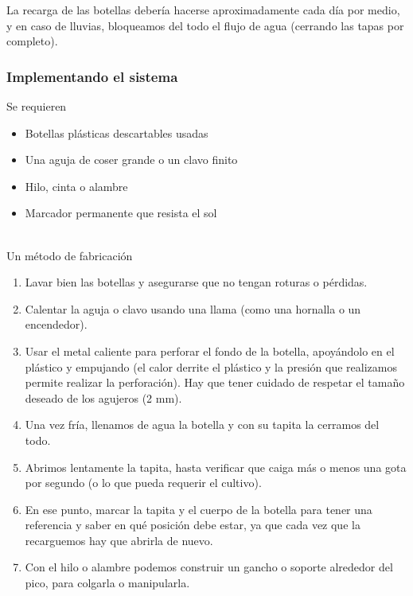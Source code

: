 \documentclass[../main.tex]{subfiles}
\begin{document}
La recarga de las botellas debería hacerse aproximadamente cada día por medio, y en caso de lluvias, bloqueamos del todo el flujo de agua (cerrando las tapas por completo). \\

\subsubsection{Implementando el sistema}

Se requieren \\
\begin{itemize}
    \item Botellas plásticas descartables usadas
    \item Una aguja de coser grande o un clavo finito
    \item Hilo, cinta o alambre
    \item Marcador permanente que resista el sol
\end{itemize}

\hfill\\

Un método de fabricación\\
\begin{enumerate}
    \item Lavar bien las botellas y asegurarse que no tengan roturas o pérdidas.
    \item Calentar la aguja o clavo usando una llama (como una hornalla o un encendedor).
    \item Usar el metal caliente para perforar el fondo de la botella, apoyándolo en el plástico y empujando (el calor derrite el plástico y la presión que realizamos permite realizar la perforación). Hay que tener cuidado de respetar el tamaño deseado de los agujeros (2 mm).
    \item Una vez fría, llenamos de agua la botella y con su tapita la cerramos del todo.
    \item Abrimos lentamente la tapita, hasta verificar que caiga más o menos una gota por segundo (o lo que pueda requerir el cultivo).
    \item En ese punto, marcar la tapita y el cuerpo de la botella para tener una referencia y saber en qué posición debe estar, ya que cada vez que la recarguemos hay que abrirla de nuevo.
    \item Con el hilo o alambre podemos construir un gancho o soporte alrededor del pico, para colgarla o manipularla.
\end{enumerate}
\end{document}
